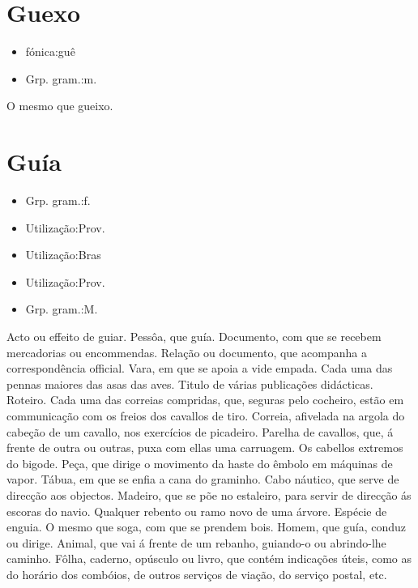 \section{Guexo}
\begin{itemize}
\item {fónica:guê}
\end{itemize}
\begin{itemize}
\item {Grp. gram.:m.}
\end{itemize}
O mesmo que \textunderscore gueixo\textunderscore .
\section{Guía}
\begin{itemize}
\item {Grp. gram.:f.}
\end{itemize}
\begin{itemize}
\item {Utilização:Prov.}
\end{itemize}
\begin{itemize}
\item {Utilização:Bras}
\end{itemize}
\begin{itemize}
\item {Utilização:Prov.}
\end{itemize}
\begin{itemize}
\item {Grp. gram.:M.}
\end{itemize}
Acto ou effeito de guiar.
Pessôa, que guía.
Documento, com que se recebem mercadorias ou encommendas.
Relação ou documento, que acompanha a correspondência official.
Vara, em que se apoia a vide empada.
Cada uma das pennas maiores das asas das aves.
Titulo de várias publicações didácticas.
Roteiro.
Cada uma das correias compridas, que, seguras pelo cocheiro, estão em communicação com os freios dos cavallos de tiro.
Correia, afivelada na argola do cabeção de um cavallo, nos exercícios de picadeiro.
Parelha de cavallos, que, á frente de outra ou outras, puxa com ellas uma carruagem.
Os cabellos extremos do bigode.
Peça, que dirige o movimento da haste do êmbolo em máquinas de vapor.
Tábua, em que se enfia a cana do graminho.
Cabo náutico, que serve de direcção aos objectos.
Madeiro, que se põe no estaleiro, para servir de direcção ás escoras do navio.
Qualquer rebento ou ramo novo de uma árvore.
Espécie de enguia.
O mesmo que \textunderscore soga\textunderscore , com que se prendem bois.
Homem, que guía, conduz ou dirige.
Animal, que vai á frente de um rebanho, guiando-o ou abrindo-lhe caminho.
Fôlha, caderno, opúsculo ou livro, que contém indicações úteis, como as do horário dos combóios, de outros serviços de viação, do serviço postal, etc.
